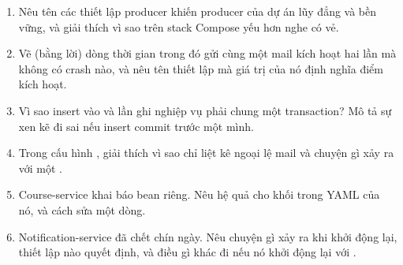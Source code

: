 \begin{quiz}
\begin{enumerate}
  \item Nêu tên các thiết lập producer khiến producer của dự án lũy
  đẳng và bền vững, và giải thích vì sao  trên stack
  Compose yếu hơn nghe có vẻ.
  \item Vẽ (bằng lời) dòng thời gian trong đó 
  gửi cùng một mail kích hoạt hai lần mà không có crash nào, và nêu tên
  thiết lập mà giá trị của nó định nghĩa điểm kích hoạt.
  \item Vì sao insert vào  và lần ghi nghiệp vụ
  phải chung một transaction? Mô tả sự xen kẽ đi sai nếu insert commit
  trước một mình.
  \item Trong cấu hình , giải thích vì sao
   chỉ liệt kê ngoại lệ mail và chuyện gì xảy ra với một
  .
  \item Course-service khai báo bean  riêng. Nêu
  hệ quả cho khối  trong YAML của nó, và
  cách sửa một dòng.
  \item Notification-service đã chết chín ngày. Nêu chuyện gì xảy ra
  khi khởi động lại, thiết lập nào quyết định, và điều gì khác đi nếu nó
  khởi động lại với .
\end{enumerate}
\end{quiz}
